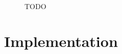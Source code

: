 \documentclass[12pt]{amsart}
\begin{document}
\begin{figure}
\endminipage
\caption{TODO}\label{fig:TODO}
\end{figure}

\section{Implementation}
\end{document}
